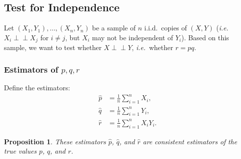 \documentclass[letterpaper, reqno]{amsart}
\newtheorem{prop}{Proposition}[section]
\numberwithin{equation}{section}
\newcommand{\ie}{\emph{i.e.\ }}
\newcommand{\indep}{\perp \!\!\! \perp}  %
\newcommand{\iid}{i.i.d.}
\newcommand{\sumi}[2]{\sum_{#1=1}^{#2}}
\newcommand{\avg}[2]{\frac{1}{#2}\sumi{#1}{#2}}
\newcommand{\phat}{\hat{p}}
\newcommand{\qhat}{\hat{q}}
\newcommand{\rhat}{\hat{r}}
\begin{document}
\subsection{Test for Independence}
Let $(X_1, Y_1), \dots, (X_n, Y_n)$ be a sample of $n$ \iid\ copies of $(X, Y)$
(\ie $X_i \indep X_j$ for $i \ne j$, but $X_i$ may not be independent of $Y_i$).
Based on this sample, we want to test whether $X \indep Y$, \ie whether $r = pq$.

\subsubsection{Estimators of $p, q, r$}
Define the estimators:
\begin{align*}
  \phat &= \avg{i}{n} X_i, \\
  \qhat &= \avg{i}{n} Y_i, \\
  \rhat &= \avg{i}{n} X_i Y_i.
\end{align*}

\begin{prop}
  These estimators $\phat$, $\qhat$, and $\rhat$ are consistent estimators of
  the true values $p$, $q$, and $r$.
\end{prop}
\end{document}

